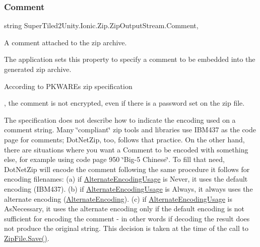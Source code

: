 \subsubsection{\texorpdfstring{Comment}{Comment}}
{\footnotesize\ttfamily string Super\+Tiled2\+Unity.\+Ionic.\+Zip.\+Zip\+Output\+Stream.\+Comment\hspace{0.3cm}{\ttfamily [get]}, {\ttfamily [set]}}



A comment attached to the zip archive. 

The application sets this property to specify a comment to be embedded into the generated zip archive. 

According to P\+K\+W\+A\+RE\textquotesingle{}s zip specification

, the comment is not encrypted, even if there is a password set on the zip file. 

The specification does not describe how to indicate the encoding used on a comment string. Many \char`\"{}compliant\char`\"{} zip tools and libraries use I\+B\+M437 as the code page for comments; Dot\+Net\+Zip, too, follows that practice. On the other hand, there are situations where you want a Comment to be encoded with something else, for example using code page 950 \char`\"{}\+Big-\/5 Chinese\char`\"{}. To fill that need, Dot\+Net\+Zip will encode the comment following the same procedure it follows for encoding filenames\+: (a) if \mbox{\hyperlink{class_super_tiled2_unity_1_1_ionic_1_1_zip_1_1_zip_output_stream_a68fe3cccef62a4745c6aacb71a05a744}{Alternate\+Encoding\+Usage}} is {\ttfamily Never}, it uses the default encoding (I\+B\+M437). (b) if \mbox{\hyperlink{class_super_tiled2_unity_1_1_ionic_1_1_zip_1_1_zip_output_stream_a68fe3cccef62a4745c6aacb71a05a744}{Alternate\+Encoding\+Usage}} is {\ttfamily Always}, it always uses the alternate encoding (\mbox{\hyperlink{class_super_tiled2_unity_1_1_ionic_1_1_zip_1_1_zip_output_stream_ab7aa76520f42cd062b9e890817f4c373}{Alternate\+Encoding}}). (c) if \mbox{\hyperlink{class_super_tiled2_unity_1_1_ionic_1_1_zip_1_1_zip_output_stream_a68fe3cccef62a4745c6aacb71a05a744}{Alternate\+Encoding\+Usage}} is {\ttfamily As\+Necessary}, it uses the alternate encoding only if the default encoding is not sufficient for encoding the comment -\/ in other words if decoding the result does not produce the original string. This decision is taken at the time of the call to {\ttfamily \mbox{\hyperlink{class_super_tiled2_unity_1_1_ionic_1_1_zip_1_1_zip_file_aff8f1b3d07b66481e2629b04017a056f}{Zip\+File.\+Save()}}}. \mbox{\label{class_super_tiled2_unity_1_1_ionic_1_1_zip_1_1_zip_output_stream_ab18e466bb7d16f7131c5a543cb9a3453}} 
